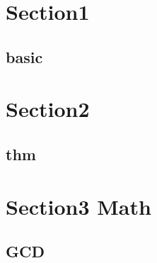 \section{Section1}
    \subsection{basic}
        

\section{Section2}
    \subsection{thm}
        
        
\section{Section3 Math}
    \subsection{GCD}
        